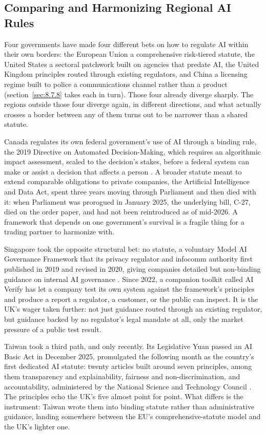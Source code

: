 \subsection{Comparing and Harmonizing Regional AI Rules}
\label{sec:8.7.4}
Four governments have made four different bets on how to regulate AI within their own borders: the European Union a comprehensive risk-tiered statute, the United States a sectoral patchwork built on agencies that predate AI, the United Kingdom principles routed through existing regulators, and China a licensing regime built to police a communications channel rather than a product (section~\ref{sec:8.7.8} takes each in turn). Those four already diverge sharply. The regions outside those four diverge again, in different directions, and what actually crosses a border between any of them turns out to be narrower than a shared statute.

Canada regulates its own federal government's use of AI through a binding rule, the 2019 Directive on Automated Decision-Making, which requires an algorithmic impact assessment, scaled to the decision's stakes, before a federal system can make or assist a decision that affects a person \autocite{tbs2019automated}. A broader statute meant to extend comparable obligations to private companies, the Artificial Intelligence and Data Act, spent three years moving through Parliament and then died with it: when Parliament was prorogued in January 2025, the underlying bill, C-27, died on the order paper, and had not been reintroduced as of mid-2026. A framework that depends on one government's survival is a fragile thing for a trading partner to harmonize with.

Singapore took the opposite structural bet: no statute, a voluntary Model AI Governance Framework that its privacy regulator and infocomm authority first published in 2019 and revised in 2020, giving companies detailed but non-binding guidance on internal AI governance \autocite{pdpc2020model}. Since 2022, a companion toolkit called AI Verify has let a company test its own system against the framework's principles and produce a report a regulator, a customer, or the public can inspect. It is the UK's wager taken further: not just guidance routed through an existing regulator, but guidance backed by no regulator's legal mandate at all, only the market pressure of a public test result.

Taiwan took a third path, and only recently. Its Legislative Yuan passed an AI Basic Act in December 2025, promulgated the following month as the country's first dedicated AI statute: twenty articles built around seven principles, among them transparency and explainability, fairness and non-discrimination, and accountability, administered by the National Science and Technology Council \autocite{moda2025basic}. The principles echo the UK's five almost point for point. What differs is the instrument: Taiwan wrote them into binding statute rather than administrative guidance, landing somewhere between the EU's comprehensive-statute model and the UK's lighter one.

